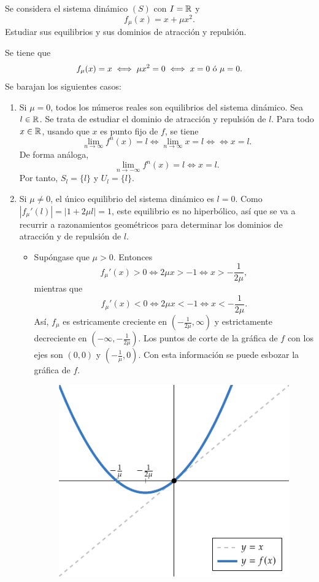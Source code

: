 \documentclass[11pt]{report}
\begin{document}
\begin{exercise}
    Se considera el sistema dinámico $(S)$ con $I = \mathbb R$ y
    \[f_\mu(x) = x+\mu x^2.\]
    Estudiar sus equilibrios y sus dominios de atracción y repulsión.
\end{exercise}

\begin{solution}
    Se tiene que
    \[f_\mu(x) = x \iff \mu x^2 = 0 \iff x = 0 \textup{ ó } \mu = 0.\]
    Se barajan los siguientes casos:
    \begin{enumerate}
        \item Si $\mu = 0$, todos los números reales son equilibrios del sistema dinámico. Sea $l \in \mathbb R$. Se trata de estudiar el dominio de atracción y repulsión de $l$. Para todo $x \in \mathbb R$, usando que $x$ es punto fijo de $f$, se tiene
        \[\lim_{n\to\infty} f^n(x) = l \iff \lim_{n\to\infty} x = l \iff \iff x = l.\]
        De forma análoga,
        \[\lim_{n\to-\infty} f^n(x) = l \iff x = l.\]
        Por tanto, $S_l = \{l\}$ y $U_l = \{l\}$.
        \item Si $\mu \neq 0$, el único equilibrio del sistema dinámico es $l = 0$. Como $|f_\mu'(l)| = |1+2\mu l| = 1$, este equilibrio es no hiperbólico, así que se va a recurrir a razonamientos geométricos para determinar los dominios de atracción y de repulsión de $l$.
        \begin{itemize}
            \item Supóngase que $\mu > 0$. Entonces
            \[f_\mu'(x) > 0 \iff 2\mu x > -1 \iff x > -\frac{1}{2\mu},\]
            mientras que 
            \[f_\mu'(x) < 0 \iff 2\mu x < -1 \iff x < -\frac{1}{2\mu}.\]
            Así, $f_\mu$ es estricamente creciente en $(-\frac{1}{2\mu},\infty)$ y estrictamente decreciente en $(-\infty,-\frac{1}{2\mu})$. Los puntos de corte de la gráfica de $f$ con los ejes son $(0, 0)$ y $(-\frac{1}{\mu},0)$. Con esta información se puede esbozar la gráfica de $f$.
            \begin{figure}[H]
            \centering
            \includegraphics{./plot3/main.pdf}

\end{figure}
\end{itemize}
\end{enumerate}
\end{solution}
\end{document}
